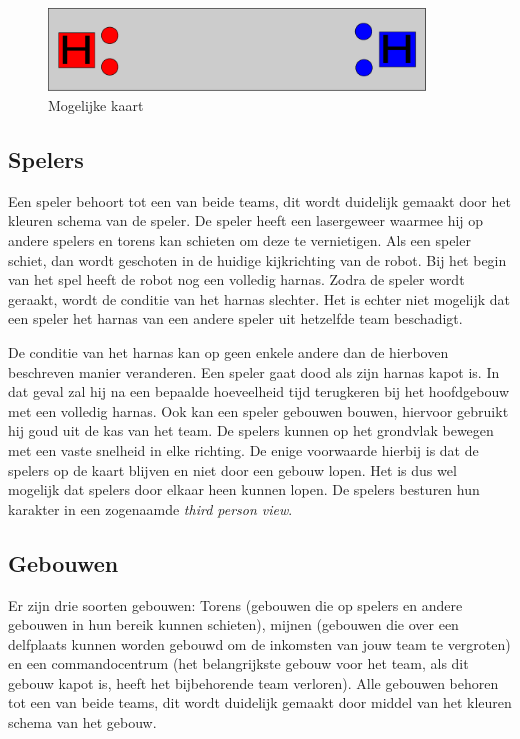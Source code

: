 \begin{figure}
\center
\includegraphics[width = 10cm]{Map2.eps}
\caption{Mogelijke kaart}
\label{fig:hist}
\end{figure}

\subsection{Spelers}
Een speler behoort tot een van beide teams, dit wordt duidelijk gemaakt door het kleuren schema van de speler. De speler heeft een lasergeweer waarmee hij op andere spelers en torens kan schieten om deze te vernietigen. Als een speler schiet, dan wordt geschoten in de huidige kijkrichting van de robot. Bij het begin van het spel heeft de robot nog een volledig harnas. Zodra de speler wordt geraakt, wordt de conditie van het harnas slechter. Het is echter niet mogelijk dat een speler het harnas van een andere speler uit hetzelfde team beschadigt.

De conditie van het harnas kan op geen enkele andere dan de hierboven beschreven manier veranderen. Een speler gaat dood als zijn harnas kapot is. In dat geval zal hij na een bepaalde hoeveelheid tijd terugkeren bij het hoofdgebouw met een volledig harnas. Ook kan een speler gebouwen bouwen, hiervoor gebruikt hij goud uit de kas van het team. De spelers kunnen op het grondvlak bewegen met een vaste snelheid in elke richting. De enige voorwaarde hierbij is dat de spelers op de kaart blijven en niet door een gebouw lopen. Het is dus wel mogelijk dat spelers door elkaar heen kunnen lopen. De spelers besturen hun karakter in een zogenaamde \emph{third person view}.

\subsection{Gebouwen}
Er zijn drie soorten gebouwen: Torens (gebouwen die op spelers en andere gebouwen in hun bereik kunnen schieten), mijnen (gebouwen die over een delfplaats kunnen worden gebouwd om de inkomsten van jouw team te vergroten) en een commandocentrum (het belangrijkste gebouw voor het team, als dit gebouw kapot is, heeft het bijbehorende team verloren). Alle gebouwen behoren tot een van beide teams, dit wordt duidelijk gemaakt door middel van het kleuren schema van het gebouw.

